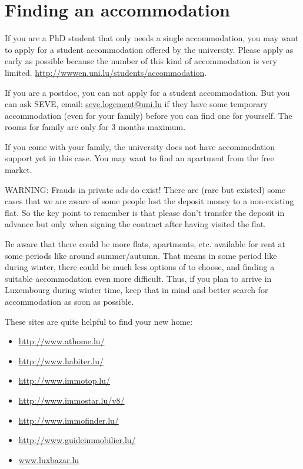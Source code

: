 \section{Finding an accommodation}
If you are a PhD student that only needs a single accommodation, you may want to apply for a student accommodation offered by the university. Please apply as early as possible because the number of this kind of accommodation is very limited.
\url{http://wwwen.uni.lu/students/accommodation}. 

If you are a postdoc, you can not apply for a student accommodation. 
But you can ask SEVE, email: \href{mailto:seve.logement@uni.lu}{seve.logement@uni.lu} if they have some temporary accommodation (even for your family) before you can find one for yourself. 
The rooms for family are only for 3 months maximum.
 
If you come with your family, the university does not have accommodation support yet in this case. You may want to find an apartment from the free market. 

WARNING: Frauds in private ads do exist! There are (rare but existed) some cases that we are aware of some people lost the deposit money to a non-existing flat. So the key point to remember is that please don't transfer the deposit in advance but only when signing the contract after having visited the flat. 

Be aware that there could be more flats, apartments, etc. available for rent at some periods like around summer/autumn. 
That means in some period like during winter, there could be much less options of to choose, and finding a suitable accommodation even more difficult. 
Thus, if you plan to arrive in Luxembourg during winter time, keep that in mind and better search for accommodation as soon as possible. 

These sites are quite helpful to find your new home:
\begin{itemize}
	\item \url{http://www.athome.lu/}
	\item \url{http://www.habiter.lu/}
	\item \url{http://www.immotop.lu/}
	\item \url{http://www.immostar.lu/v8/}
	\item \url{http://www.immofinder.lu/}
	\item \url{http://www.guideimmobilier.lu/}
	\item \url{www.luxbazar.lu}
\end{itemize}

